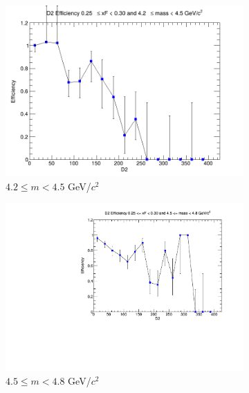 \documentclass[11pt]{article}
\begin{document}
\begin{figure}[p]
    \centering
    \begin{subfigure}[b]{0.32\textwidth}
        \centering
        \includegraphics[width=\textwidth]{./kTrackerEfficiencyPlots/D2_Efficiency_xF5_mass0.png}
        \caption{$4.2 \leq m < 4.5$ GeV/$c^2$}
    \end{subfigure}\hfill
    \begin{subfigure}[b]{0.32\textwidth}
        \centering
        \includegraphics[width=\textwidth]{./kTrackerEfficiencyPlots/D2_Efficiency_xF5_mass1.pdf}
        \caption{$4.5 \leq m < 4.8$ GeV/$c^2$}
    \end{subfigure}\hfill
    \begin{subfigure}[b]{0.32\textwidth}
        \centering

\end{subfigure}
\end{figure}
\end{document}
